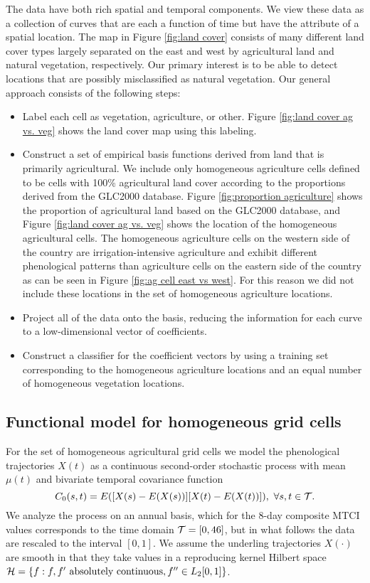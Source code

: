 The data have both rich spatial and temporal components. We view these data as a collection of curves that are each a function of time but have the attribute of a spatial location. The map in Figure \ref{fig:land cover} consists of many different land cover types largely separated on the east and west by agricultural land and natural vegetation, respectively. Our primary interest is to be able to detect locations that are possibly misclassified as natural vegetation. Our general approach consists of the following steps:
\begin{itemize}
	\item Label each cell as vegetation, agriculture, or other. Figure \ref{fig:land cover ag vs. veg} shows the land cover map using this labeling.
	\item Construct a set of empirical basis functions derived from land that is primarily agricultural. We include only homogeneous agriculture cells defined to be cells with 100\% agricultural land cover according to the proportions derived from the GLC2000 database. Figure \ref{fig:proportion agriculture} shows the proportion of agricultural land based on the GLC2000 database, and Figure \ref{fig:land cover ag vs. veg} shows the location of the homogeneous agricultural cells. The homogeneous agriculture cells on the western side of the country are irrigation-intensive agriculture and exhibit different phenological patterns than agriculture cells on the eastern side of the country as can be seen in Figure \ref{fig:ag cell east vs west}. For this reason we did not include these locations in the set of homogeneous agriculture locations. 
	\item Project all of the data onto the basis, reducing the information for each curve to a low-dimensional vector of coefficients.
	\item Construct a classifier for the coefficient vectors by using a training set corresponding to the homogeneous agriculture locations and an equal number of homogeneous vegetation locations.  
\end{itemize}

\subsection{Functional model for homogeneous grid cells} %
\label{sub:subsection_name}

 For the set of homogeneous agricultural grid cells we model the phenological trajectories $X(t)$ as a continuous second-order stochastic process with mean $\mu(t)$ and bivariate temporal covariance function
\[ C_{0}(s,t)=E([X(s)-E(X(s))][X(t)-E(X(t))]),\mbox{ }\forall s,t\in \mathcal{T}. \]
We analyze the process on an annual basis, which for the 8-day composite MTCI values corresponds to the time domain $\mathcal{T} = [0,46]$, but in what follows the data are rescaled to the interval $[0,1]$. We assume the underling trajectories $X(\cdot)$ are smooth in that they take values in a reproducing kernel Hilbert space $\mathcal{H}= \{f : f, f' \mbox{ absolutely continuous}, f'' \in L_2[0,1]\}$. 

